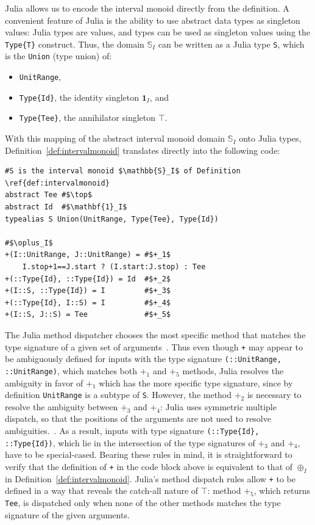 \documentclass{sig-alternate}
\newcommand{\code}[1]{\texttt{#1}}
\begin{document}
Julia allows us to encode the interval monoid directly from the definition. A
convenient feature of Julia is the ability to use abstract data types as
singleton values: Julia types are values, and types can be used as singleton
values using the \code{Type\{T\}} construct. Thus, the domain $\mathbb S_I$ can
be written as a Julia type \code{S}, which is the \code{Union} (type union) of:

\begin{itemize}
	\item \code{UnitRange},
	\item \code{Type\{Id\}}, the identity singleton $\mathbf 1_I$, and
	\item \code{Type\{Tee\}}, the annihilator singleton $\top$.
\end{itemize}

With this mapping of the abstract interval monoid domain $\mathbb S_I$ onto
Julia types, Definition~\ref{def:intervalmonoid} translates directly into the
following code:

\begin{verbatim}
#S is the interval monoid $\mathbb{S}_I$ of Definition \ref{def:intervalmonoid}
abstract Tee #$\top$
abstract Id  #$\mathbf{1}_I$
typealias S Union(UnitRange, Type{Tee}, Type{Id})

#$\oplus_I$
+(I::UnitRange, J::UnitRange) = #$+_1$ 
    I.stop+1==J.start ? (I.start:J.stop) : Tee
+(::Type{Id}, ::Type{Id}) = Id  #$+_2$
+(I::S, ::Type{Id}) = I         #$+_3$
+(::Type{Id}, I::S) = I         #$+_4$
+(I::S, J::S) = Tee             #$+_5$
\end{verbatim}

The Julia method dispatcher chooses the most specific method that matches the
type signature of a given set of arguments~\cite{Bezanson2012}. Thus even
though \code{+} may appear to be ambiguously defined for inputs with the type
signature \code{(::Unit\-Range, ::UnitRange)}, which matches both $+_1$ and $+_5$
methods, Julia resolves the ambiguity in favor of $+_1$ which has the more
specific type signature, since by definition \code{UnitRange} is a subtype of
\code{S}. However, the method $+_2$ is necessary to resolve the ambiguity
between $+_3$ and $+_4$: Julia uses symmetric multiple dispatch, so that the
positions of the arguments are not used to resolve
ambiguities.~\cite{Bezanson2012}. As a result, inputs with type signature
\code{(::Type\{Id\}, ::Type\{Id\})}, which lie in the intersection of the type
signatures of $+_3$ and $+_4$, have to be special-cased. Bearing these rules in
mind, it is straightforward to verify that the definition of \code{+} in the
code block above is equivalent to that of $\oplus_I$ in
Definition~\ref{def:intervalmonoid}. Julia's method dispatch rules allow
\code{+} to be defined in a way that reveals the catch-all nature of $\top$:
method $+_5$, which returns \code{Tee}, is dispatched only when none of the
other methods matches the type signature of the given arguments.
\end{document}
